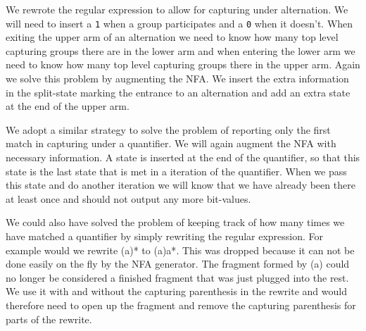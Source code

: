 We rewrote the regular expression to allow for capturing under
alternation. We will need to insert a \texttt{1} when a group
participates and a \texttt{0} when it doesn't. When exiting the upper
arm of an alternation we need to know how many top level capturing
groups there are in the lower arm and when entering the lower arm we
need to know how many top level capturing groups there in the upper
arm. Again we solve this problem by augmenting the NFA. We insert the
extra information in the split-state marking the entrance to an
alternation and add an extra state at the end of the upper arm.


We adopt a similar strategy to solve the problem of reporting only the
first match in capturing under a quantifier. We will again augment the
NFA with necessary information. A state is inserted at the end of the
quantifier, so that this state is the last state that is met in a
iteration of the quantifier. When we pass this state and do another
iteration we will know that we have already been there at least once
and should not output any more bit-values.



We could also have solved the problem of keeping track of how many
times we have matched a quantifier by simply rewriting the regular
expression. For example would we rewrite \textsf{(a)*} to
\textsf{(\textbar a)a*}. This was dropped because it can not be done
easily on the fly by the NFA generator. The fragment formed by
\textsf{(a)} could no longer be considered a finished fragment that
was just plugged into the rest. We use it with and without the
capturing parenthesis in the rewrite and would therefore need to open
up the fragment and remove the capturing parenthesis for parts of the
rewrite.


